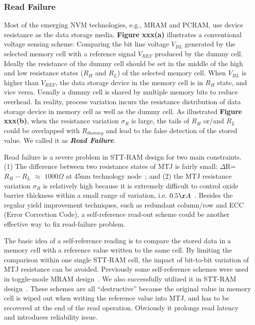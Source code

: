 \subsubsection{Read Failure}
Most of the emerging NVM technologies, e.g., MRAM and PCRAM, use device resistance as the data storage media. \textbf{Figure xxx(a)} illustrates a conventional voltage sensing scheme: Comparing the bit line voltage $V_{BL}$ generated by the selected memory cell with a reference signal $V_{REF}$ produced by the dummy cell. Ideally the resistance of the dummy cell should be set in the middle of the high and low resistance states ($R_H$ and $R_L$) of the selected memory cell. When $V_{BL}$ is higher than $V_{REF}$, the data storage device in the memory cell is in $R_H$ state, and vice versa. Usually a dummy cell is shared by multiple memory bits to reduce overhead. In reality, process variation incurs the resistance distribution of data storage device in memory cell as well as the dummy cell. As illustrated \textbf{Figure xxx(b)}, when the resistance variation $\sigma_R$ is large, the tails of $R_H$ or/and $R_L$ could be overlapped with $R_{dummy}$ and lead to the false detection of the stored value. We called it as \textbf{\emph{Read Failure}}.

Read failure is a severe problem in STT-RAM design for two main constraints. (1) The difference between two resistance states of MTJ is fairly small: $\Delta$R=$R_H-R_L$ $\approx$ $1000\Omega$ at 45nm technology node~\cite{Li09}; and (2) the MTJ resistance variation $\sigma_R$ is relatively high because it is extremely difficult to control oxide barrier thickness within a small range of variation, i.e. $0.5{\AA}$~\cite{Jeong03}. Besides the regular yield improvement techniques, such as redundant column/row and ECC (Error Correction Code), a self-reference read-out scheme could be another effective way to fix read-failure problem.

The basic idea of a self-reference reading is to compare the stored data in a memory cell with a reference value written to the same cell. By limiting the comparison within one single STT-RAM cell, the impact of bit-to-bit variation of MTJ resistance can be avoided. Previously some self-reference schemes were used in toggle-mode MRAM design~\cite{Tanizaki06,Jeong03}. We also successfully utilized it in STT-RAM design~\cite{Li:147723}. These schemes are all ``destructive'' because the original value in memory cell is wiped out when writing the reference value into MTJ, and has to be recovered at the end of the read operation. Obviously it prolongs read latency and introduces reliability issue.

